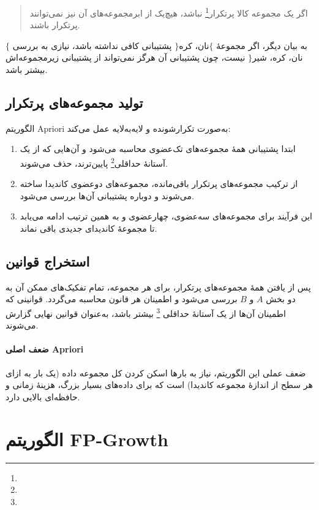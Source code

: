 \begin{quote}
اگر یک مجموعه کالا پرتکرار\footnote{} نباشد، هیچ‌یک از
ابرمجموعه‌های آن نیز نمی‌توانند پرتکرار باشند.
\end{quote}

به بیان دیگر، اگر مجموعهٔ $\{$نان، کره$\}$ پشتیبانی کافی نداشته باشد،
نیازی به بررسی $\{$نان، کره، شیر$\}$ نیست، چون پشتیبانی آن هرگز نمی‌تواند
از پشتیبانی زیرمجموعه‌اش بیشتر باشد.

\subsection{تولید مجموعه‌های پرتکرار}

الگوریتم Apriori به‌صورت تکرارشونده و لایه‌به‌لایه عمل می‌کند:

\begin{enumerate}
    \item ابتدا پشتیبانی همهٔ مجموعه‌های تک‌عضوی محاسبه می‌شود و آن‌هایی
          که از یک آستانهٔ حداقلی\footnote{} پایین‌ترند،
          حذف می‌شوند.
    \item از ترکیب مجموعه‌های پرتکرار باقی‌مانده، مجموعه‌های دوعضوی
          کاندیدا ساخته می‌شوند و دوباره پشتیبانی آن‌ها بررسی می‌شود.
    \item این فرآیند برای مجموعه‌های سه‌عضوی، چهارعضوی و به همین ترتیب
          ادامه می‌یابد تا مجموعهٔ کاندیدای جدیدی باقی نماند.
\end{enumerate}

\subsection{استخراج قوانین}

پس از یافتن همهٔ مجموعه‌های پرتکرار، برای هر مجموعه، تمام تفکیک‌های
ممکن آن به دو بخش $A$ و $B$ بررسی می‌شود و اطمینان هر قانون محاسبه
می‌گردد. قوانینی که اطمینان آن‌ها از یک آستانهٔ حداقلی
\footnote{} بیشتر باشد، به‌عنوان قوانین نهایی
گزارش می‌شوند.

\paragraph{ضعف اصلی Apriori}
ضعف عملی این الگوریتم، نیاز به بارها اسکن کردن کل مجموعه داده (یک بار
به ازای هر سطح از اندازهٔ مجموعه کاندیدا) است که برای داده‌های بسیار
بزرگ، هزینهٔ زمانی و حافظه‌ای بالایی دارد.

\section{الگوریتم FP-Growth}

